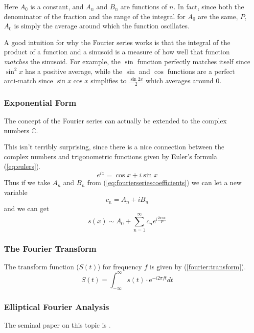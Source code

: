 \documentclass[12pt,english]{article}
\begin{document}
Here \(A_0\) is a constant, and \(A_n\) and \(B_n\) are functions of \(n\).
In fact, since both the denominator of the fraction and the range of the integral for \(A_0\) are the same, \(P\),
\(A_0\) is simply the average around which the function oscillates.

A good intuition for why the Fourier series works is that the
integral of the product of a function and a sinusoid is a measure
of how well that function \textit{matches} the sinusoid.
For example, the $\sin$ function perfectly matches itself since 
$\sin^2x$ has a positive average, while the $\sin$ and $\cos$
functions are a perfect anti-match since $\sin x \cos x$ simplifies
to $\frac{\sin 2x}{2}$ which averages around $0$.

\subsubsection{Exponential Form}
The concept of the Fourier series can actually be extended to the 
complex numbers $\mathbb{C}$.

This isn't terribly surprising, since there is a nice connection between the
complex numbers and trigonometric functions given by Euler's formula (\ref{eq:eulers}).
\begin{equation} \label{eq:eulers}
	e^{ix}=\cos{x}+i\sin{x}
\end{equation}
Thus if we take $A_n$  and $B_n$ from
(\ref{eq:fourierseriescoefficients})
we can let a new variable
\begin{displaymath}
	c_n = A_n + i B_n
\end{displaymath}
and we can get
\begin{equation}
	s(x) \sim A_0 + \sum_{n=1}^{\infty}
		c_ne^{i\frac{2\pi nx}{P}}
\end{equation}

\subsubsection{The Fourier Transform}
The transform function ($S(t)$) for frequency $f$ is given by
(\ref{fourier:transform}).
\begin{equation} \label{fourier:transform}
	S(t)=\int_{-\infty}^{\infty}s(t)\cdot \mathrm{e}^{-i2\pi ft} dt
\end{equation}

\subsubsection{Elliptical Fourier Analysis}
The seminal paper on this topic is \cite{kuhl:1982}.
\end{document}
